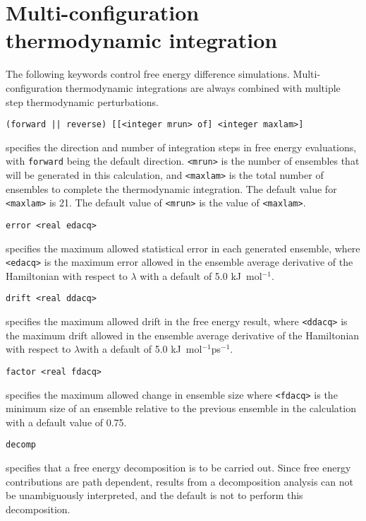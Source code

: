 \section{Multi-configuration thermodynamic integration}
The following keywords control free energy difference simulations.
Multi-configuration thermodynamic integrations are always combined
with multiple step thermodynamic perturbations.
\begin{description}

\item
\begin{verbatim}
(forward || reverse) [[<integer mrun> of] <integer maxlam>]
\end{verbatim}
specifies the direction and number of integration steps in free
energy evaluations, with {\tt forward} being the default direction.
\verb+<mrun>+ is the number of ensembles that will be generated in
this calculation, and \verb+<maxlam>+ is the total number of ensembles
to complete the thermodynamic integration. The default value for 
\verb+<maxlam>+ is 21. The default value of \verb+<mrun>+ is the 
value of \verb+<maxlam>+.

\item
\begin{verbatim}
error <real edacq>
\end{verbatim}
specifies the maximum allowed statistical error in each generated
ensemble, where \verb+<edacq>+ is the maximum error allowed in the 
ensemble average derivative of the Hamiltonian with respect to 
$\lambda$ with a default of 5.0 kJ~mol$^{-1}$.

\item
\begin{verbatim}
drift <real ddacq>
\end{verbatim}
specifies the maximum allowed drift in the free energy result,
where \verb+<ddacq>+ is the maximum drift allowed in the
ensemble average derivative of the Hamiltonian with respect to 
$\lambda$with a default of 5.0 kJ~mol$^{-1}$ps$^{-1}$.

\item
\begin{verbatim}
factor <real fdacq>
\end{verbatim}
specifies the maximum allowed change in ensemble size
where \verb+<fdacq>+ is the minimum size of an ensemble relative to the
previous ensemble in the calculation with a default value of 0.75.

\item
\begin{verbatim}
decomp
\end{verbatim}
specifies that a free energy decomposition is to be carried out.
Since free energy contributions are path dependent, results from a
decomposition analysis can not be unambiguously interpreted, and
the default is not to perform this decomposition.


\end{description}
